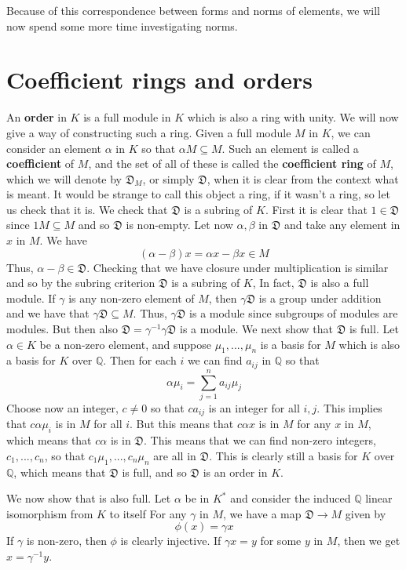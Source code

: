 \documentclass{article}
\newcommand{\mfrak}[1]{\mathfrak{#1}}
\newcommand{\mbb}[1]{\mathbb{#1}}
\begin{document}
Because of this correspondence between forms and norms of elements, we will now spend some more time investigating norms. 

\section*{Coefficient rings and orders}
An \textbf{order} in $K$ is a full module in $K$ which is also a ring with unity. We will now give a way of constructing such a ring. Given a full module $M$ in $K$, we can consider an element $\alpha$ in $K$ so that $\alpha M \subseteq M$. Such an element is called a \textbf{coefficient} of $M$, and the set of all of these is called the \textbf{coefficient ring} of $M$, which we will denote by $\mfrak D_M$, or simply $\mfrak D$, when it is clear from the context what is meant. It would be strange to call this object a ring, if it wasn't a ring, so let us check that it is. We check that $\mfrak D$ is a subring of $K$. First it is clear that $1 \in \mfrak{D}$ since $1 M \subseteq M$ and so $\mfrak{D}$ is non-empty. Let now $\alpha, \beta$ in $\mfrak D$ and take any element in $x$ in $M$. We have $$(\alpha - \beta)x = \alpha x - \beta x \in M$$
Thus, $\alpha - \beta \in \mfrak{D}$. Checking that we have closure under multiplication is similar and so by the subring criterion $\mfrak{D}$ is a subring of $K$, In fact, $\mfrak{D}$ is also a full module. If $\gamma$ is any non-zero element of $M$, then $\gamma \mfrak{D}$ is a group under addition and we have that $\gamma \mfrak{D} \subseteq M$. Thus, $\gamma \mfrak D$ is a module since subgroups of modules are modules. But then also $\mfrak{D} = \gamma^{-1} \gamma \mfrak{D}$ is a module. We next show that $\mfrak D$ is full. Let $\alpha \in K$ be a non-zero element, and suppose $\mu_1, ..., \mu_n$ is a basis for $M$ which is also a basis for $K$ over $\mbb Q$. Then for each $i$ we can find $a_{ij}$ in $\mbb Q$ so that
$$\alpha \mu_i = \sum_{j=1}^n a_{ij} \mu_j$$
Choose now an integer, $c \neq 0$ so that $c a_{ij}$ is an integer for all $i,j$. This implies that $c \alpha \mu_i$ is in $M$ for all $i$. But this means that $c \alpha x$ is in $M$ for any $x$ in $M$, which means that $c \alpha$ is in $\mfrak D$. This means that we can find non-zero integers, $c_1, ..., c_n$, so that $c_1 \mu_1, ..., c_n \mu_n$ are all in $\mfrak D$. This is clearly still a basis for $K$ over $\mbb Q$, which means that $\mfrak D$ is full, and so $\mfrak D$ is an order in $K$.

We now show that is also full. Let $\alpha$ be in $K^*$ and consider the induced $\mbb Q$ linear isomorphism from $K$ to itself 
For any $\gamma$ in $M$, we have a map $\mfrak D \to M$ given by
$$\phi(x) = \gamma x$$
If $\gamma$ is non-zero, then $\phi$ is clearly injective. If $\gamma x = y$ for some $y$ in $M$, then we get $x = \gamma^{-1} y$.  
\end{document}
